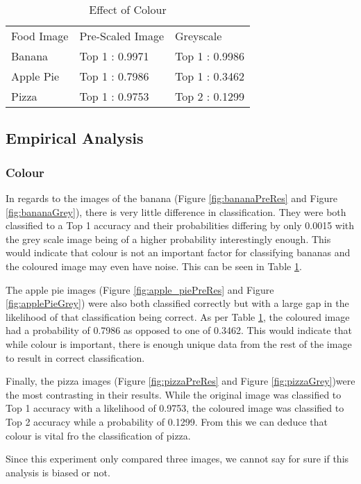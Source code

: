 \begin{table}[]
\centering
\caption{Effect of Colour}
\label{colour}
\begin{tabular}{lll}
Food Image & Pre-Scaled Image & Greyscale      \\
Banana     & Top 1 : 0.9971   & Top 1 : 0.9986 \\
Apple Pie  & Top 1 : 0.7986   & Top 1 : 0.3462   \\
Pizza      & Top 1 : 0.9753   & Top 2 : 0.1299
\end{tabular}
\end{table}

\subsection*{Empirical Analysis}
\subsubsection*{Colour}
In regards to the images of the banana (Figure \ref{fig:bananaPreRes} and Figure \ref{fig:bananaGrey}), there is very little difference in classification. They were both classified to a Top 1 accuracy and their probabilities differing by only 0.0015 with the grey scale image being of a higher probability interestingly enough. This would indicate that colour is not an important factor for classifying bananas and the coloured image may even have noise. This can be seen in Table \ref{colour}.

The apple pie images (Figure \ref{fig:apple_piePreRes} and Figure \ref{fig:applePieGrey}) were also both classified correctly but with a large gap in the likelihood of that classification being correct. As per Table \ref{colour}, the coloured image had a probability of 0.7986 as opposed to one of 0.3462. This would indicate that while colour is important, there is enough unique data from the rest of the image to result in correct classification.

Finally, the pizza images (Figure \ref{fig:pizzaPreRes} and Figure \ref{fig:pizzaGrey})were the most contrasting in their results. While the original image was classified to Top 1 accuracy with a likelihood of 0.9753, the coloured image was classified to Top 2 accuracy while a probability of 0.1299. From this we can deduce that colour is vital fro the classification of pizza.

Since this experiment only compared three images, we cannot say for sure if this analysis is biased or not.

